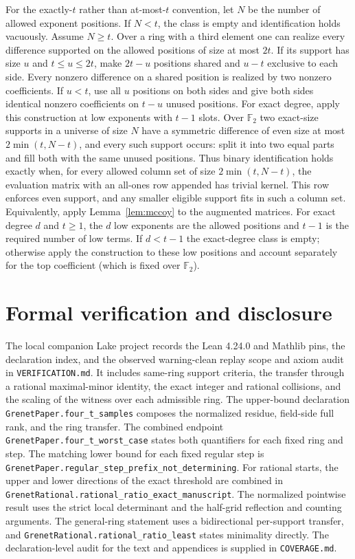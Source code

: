 \documentclass[10pt]{article}
\newcommand{\Fp}{\mathbb F}
\begin{document}
For the exactly-$t$ rather than at-most-$t$ convention, let $N$
be the number of allowed exponent positions. If $N<t$, the class
is empty and identification holds vacuously. Assume $N\ge t$.
Over a ring with a third element one can realize every difference
supported on the allowed positions of size at most $2t$.
If its support has size $u$ and $t\le u\le2t$, make $2t-u$
positions shared and $u-t$ exclusive to each side. Every nonzero
difference on a shared position is realized by two nonzero
coefficients. If $u<t$, use all $u$ positions on both sides
and give both sides identical nonzero coefficients on $t-u$
unused positions. For exact degree, apply this construction at
low exponents with $t-1$ slots. Over $\Fp_2$ two exact-size
supports in a universe of size $N$ have a symmetric difference of
even size at most $2\min(t,N-t)$, and every such support occurs:
split it into two equal parts and fill both with the same unused
positions. Thus binary identification holds exactly when, for every allowed
column set of size $2\min(t,N-t)$, the evaluation matrix with an
all-ones row appended has trivial kernel. This row enforces even
support, and any smaller eligible support fits in such a column set.
Equivalently, apply Lemma~\ref{lem:mccoy} to the augmented matrices.
For exact degree $d$ and $t\ge 1$, the $d$ low exponents are the
allowed positions and $t-1$ is the required number of low terms.
If $d<t-1$ the exact-degree class is empty; otherwise apply the
construction to these low positions and account separately for
the top coefficient (which is fixed over $\Fp_2$).

\clearpage
\section{Formal verification and disclosure}
The local companion Lake project records the Lean 4.24.0 and
Mathlib pins, the declaration index, and the observed warning-clean
replay scope and axiom audit in \texttt{VERIFICATION.md}.
It includes same-ring support criteria, the transfer through a
rational maximal-minor identity, the exact integer and rational
collisions, and the scaling of the witness over each admissible ring.
The upper-bound declaration
\verb|GrenetPaper.four_t_samples| composes the normalized residue,
field-side full rank, and the ring transfer. The combined endpoint
\verb|GrenetPaper.four_t_worst_case| states both quantifiers for
each fixed ring and step. The matching lower
bound for each fixed regular step is
\verb|GrenetPaper.regular_step_prefix_not_determining|.
For rational starts, the upper and lower directions of the exact threshold
are combined in \verb|GrenetRational.rational_ratio_exact_manuscript|.
The normalized pointwise result uses the strict local determinant and
the half-grid reflection and counting arguments. The general-ring
statement uses a bidirectional per-support transfer, and
\verb|GrenetRational.rational_ratio_least| states minimality directly.
The declaration-level audit for the text and appendices is supplied in
\texttt{COVERAGE.md}.
\end{document}
